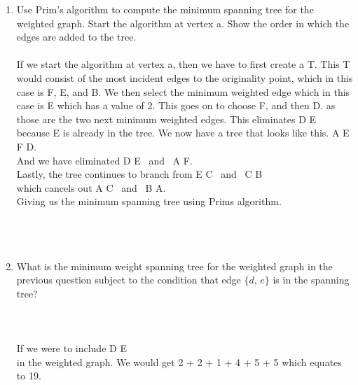 \begin{enumerate}[label=(\alph*)]
\item Use Prim's algorithm to compute the minimum spanning tree for the weighted graph. Start the algorithm at vertex a. Show the order in which the edges are added to the tree.\\\\
If we start the algorithm at vertex a, then we have to first create a T. This T would consist of the most incident edges to the originality point, which in this case is F, E, and B. We then select the minimum weighted edge which in this case is E which has a value of 2. This goes on to choose F, and then D. as those are the two next minimum weighted edges. This eliminates D \to E \\

because E is already in the tree. We now have a tree that looks like this. A \to E \to F \to D. \\

And we have eliminated D \to E \ and \ A \to F. \\

Lastly, the tree continues to branch from E \to C \ and \ C \to B \\

which cancels out A \to C \ and \ B \to A. 
\\

Giving us the minimum spanning tree using Prims algorithm.\\ 
 \\

\\\\
\item What is the minimum weight spanning tree for the weighted graph in the previous question subject to the condition that edge $\{d,\, e\}$ is in the spanning tree?\\\\\\\\
    If we were to include D \to E \\
    
    in the weighted graph. We would get 2 + 2 + 1 + 4 + 5 + 5 which equates to 19.
     \\
    

\end{enumerate}
